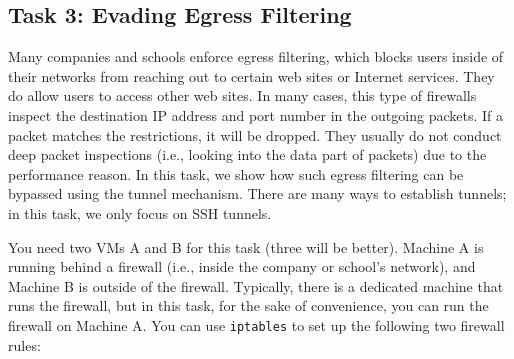 \subsection{Task 3: Evading Egress Filtering}

Many companies and schools enforce egress filtering, which blocks users
inside of their networks from reaching out to certain web sites or Internet
services. They do allow users to access other web sites. 
In many cases, this type of firewalls inspect 
the destination IP address and port number in the outgoing packets. If 
a packet matches the restrictions, it will be dropped. 
They usually do not conduct deep packet inspections (i.e., looking into
the data part of packets) due to the performance reason. 
In this task, we show how such egress filtering can be bypassed using
the tunnel mechanism. There are many ways to establish tunnels; 
in this task, we only focus on SSH tunnels.

You need two VMs A and B for this task (three will be better). Machine A is running 
behind a firewall (i.e., inside the company or school's network), and Machine B 
is outside of the firewall.
Typically, there is a dedicated machine that runs the firewall, but
in this task, for the sake of convenience, you can run the firewall 
on Machine A.
You can use {\tt iptables} to set up the following
two firewall rules:


